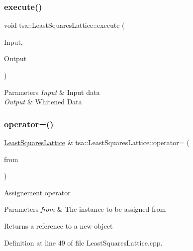 \subsubsection{\texorpdfstring{execute()}{execute()}}
{\footnotesize\ttfamily void tsa\+::\+Least\+Squares\+Lattice\+::execute (\begin{DoxyParamCaption}\item[{\hyperlink{namespacetsa_a8900fb03d849baf447a1a0efe2561fb2}{Dvector} \&}]{Input,  }\item[{\hyperlink{namespacetsa_a8900fb03d849baf447a1a0efe2561fb2}{Dvector} \&}]{Output }\end{DoxyParamCaption})}


\begin{DoxyParams}{Parameters}
{\em Input} & Input data \\
\hline
{\em Output} & Whitened Data \\
\hline
\end{DoxyParams}
\mbox{\label{classtsa_1_1_least_squares_lattice_a7037938b899e80b09bb34c053d1c7f41}} 
\subsubsection{\texorpdfstring{operator=()}{operator=()}}
{\footnotesize\ttfamily \hyperlink{classtsa_1_1_least_squares_lattice}{Least\+Squares\+Lattice} \& tsa\+::\+Least\+Squares\+Lattice\+::operator= (\begin{DoxyParamCaption}\item[{const \hyperlink{classtsa_1_1_least_squares_lattice}{Least\+Squares\+Lattice} \&}]{from }\end{DoxyParamCaption})}

Assignement operator


\begin{DoxyParams}{Parameters}
{\em from} & The instance to be assigned from\\
\hline
\end{DoxyParams}
\begin{DoxyReturn}{Returns}
a reference to a new object 
\end{DoxyReturn}


Definition at line 49 of file Least\+Squares\+Lattice.\+cpp.



